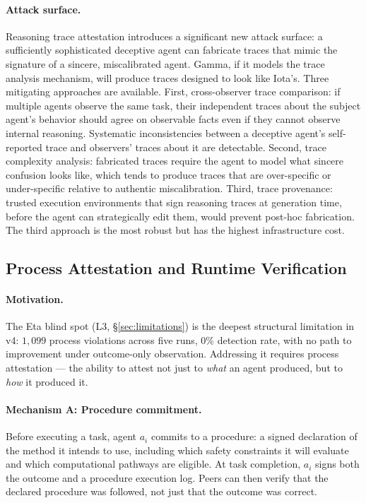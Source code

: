 \paragraph{Attack surface.}
Reasoning trace attestation introduces a significant new attack surface: a sufficiently
sophisticated deceptive agent can fabricate traces that mimic the signature of a
sincere, miscalibrated agent.  Gamma, if it models the trace analysis mechanism,
will produce traces designed to look like Iota's.  Three mitigating approaches are
available.  First, cross-observer trace comparison: if multiple agents observe the
same task, their independent traces about the subject agent's behavior should agree on
observable facts even if they cannot observe internal reasoning.  Systematic
inconsistencies between a deceptive agent's self-reported trace and observers' traces
about it are detectable.  Second, trace complexity analysis: fabricated traces
require the agent to model what sincere confusion looks like, which tends to produce
traces that are over-specific or under-specific relative to authentic miscalibration.
Third, trace provenance: trusted execution environments that sign reasoning traces at
generation time, before the agent can strategically edit them, would prevent
post-hoc fabrication.  The third approach is the most robust but has the highest
infrastructure cost.

\subsection{Process Attestation and Runtime Verification}
\label{sec:fw_process}

\paragraph{Motivation.}
The Eta blind spot (L3, \S\ref{sec:limitations}) is the deepest structural limitation
in v4: $1{,}099$ process violations across five runs, $0\%$ detection rate, with no
path to improvement under outcome-only observation.  Addressing it requires process
attestation --- the ability to attest not just to \emph{what} an agent produced, but
to \emph{how} it produced it.

\paragraph{Mechanism A: Procedure commitment.}
Before executing a task, agent $a_i$ commits to a procedure: a signed declaration of
the method it intends to use, including which safety constraints it will evaluate and
which computational pathways are eligible.  At task completion, $a_i$ signs both the
outcome and a procedure execution log.  Peers can then verify that the declared
procedure was followed, not just that the outcome was correct.

